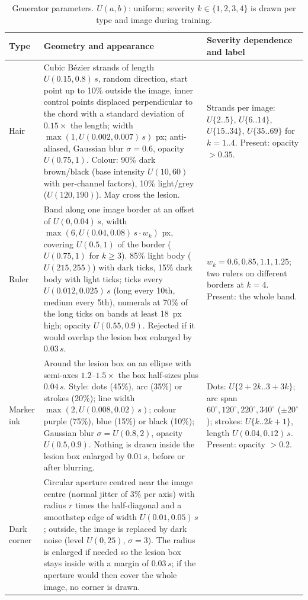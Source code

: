 \documentclass[10pt,a4paper]{article}
\begin{document}
\begin{table}[H]
\centering
\caption{Generator parameters. $U(a,b)$: uniform; severity $k\in\{1,2,3,4\}$ is drawn per type and image during training.}
\label{tab:s-generator}
\footnotesize
\begin{tabularx}{\textwidth}{@{}l>{\raggedright\arraybackslash}X>{\raggedright\arraybackslash}p{}@{}}
\toprule
Type & Geometry and appearance & Severity dependence and label \\
\midrule
Hair &
Cubic B\'ezier strands of length $U(0.15,0.8)\,s$, random direction, start point up to 10\% outside the image, inner control points displaced perpendicular to the chord with a standard deviation of $0.15\times$ the length; width $\max(1,U(0.002,0.007)\,s)$ px; anti-aliased, Gaussian blur $\sigma=0.6$, opacity $U(0.75,1)$. Colour: 90\% dark brown/black (base intensity $U(10,60)$ with per-channel factors), 10\% light/grey ($U(120,190)$). May cross the lesion. &
Strands per image: $U\{2..5\}$, $U\{6..14\}$, $U\{15..34\}$, $U\{35..69\}$ for $k=1..4$. Present: opacity $>0.35$. \\
\addlinespace
Ruler &
Band along one image border at an offset of $U(0,0.04)\,s$, width $\max(6,U(0.04,0.08)\,s\cdot w_k)$ px, covering $U(0.5,1)$ of the border ($U(0.75,1)$ for $k\ge3$). 85\% light body ($U(215,255)$) with dark ticks, 15\% dark body with light ticks; ticks every $U(0.012,0.025)\,s$ (long every 10th, medium every 5th), numerals at 70\% of the long ticks on bands at least 18~px high; opacity $U(0.55,0.9)$. Rejected if it would overlap the lesion box enlarged by $0.03\,s$. &
$w_k=0.6,0.85,1.1,1.25$; two rulers on different borders at $k=4$. Present: the whole band. \\
\addlinespace
Marker ink &
Around the lesion box on an ellipse with semi-axes $1.2$--$1.5\times$ the box half-sizes plus $0.04\,s$. Style: dots (45\%), arc (35\%) or strokes (20\%); line width $\max(2,U(0.008,0.02)\,s)$; colour purple (75\%), blue (15\%) or black (10\%); Gaussian blur $\sigma=U(0.8,2)$, opacity $U(0.5,0.9)$. Nothing is drawn inside the lesion box enlarged by $0.01\,s$, before or after blurring. &
Dots: $U\{2+2k..3+3k\}$; arc span $60^\circ,120^\circ,220^\circ,340^\circ$ ($\pm20^\circ$); strokes: $U\{k..2k+1\}$, length $U(0.04,0.12)\,s$. Present: opacity $>0.2$. \\
\addlinespace
Dark corner &
Circular aperture centred near the image centre (normal jitter of 3\% per axis) with radius $r$ times the half-diagonal and a smoothstep edge of width $U(0.01,0.05)\,s$; outside, the image is replaced by dark noise (level $U(0,25)$, $\sigma=3$). The radius is enlarged if needed so the lesion box stays inside with a margin of $0.03\,s$; if the aperture would then cover the whole image, no corner is drawn. &

\end{tabularx}
\end{table}
\end{document}

